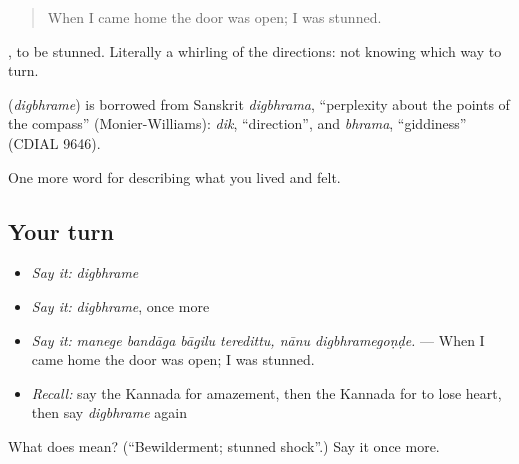 \begin{quote}
When I came home the door was open; I was stunned.
\end{quote}

, to be stunned. Literally a whirling of the directions: not knowing which way to turn.

\begin{cousinweb}
\textbf{} (\emph{digbhrame}) is borrowed from Sanskrit \emph{digbhrama}, \textquotedblleft{}perplexity about the points of the compass\textquotedblright{} (Monier-Williams): \emph{dik}, \textquotedblleft{}direction\textquotedblright{}, and \emph{bhrama}, \textquotedblleft{}giddiness\textquotedblright{} (CDIAL 9646).
\end{cousinweb}

\begin{grammarlens}[title={What you've built}]
One more word for describing what you lived and felt.
\end{grammarlens}

\subsection*{Your turn}
\begin{itemize}
\raggedright
  \item \emph{Say it:} \emph{digbhrame}
  \item \emph{Say it:} \emph{digbhrame}, once more
  \item \emph{Say it:} \emph{manege bandāga bāgilu teredittu, nānu digbhramegoṇḍe.} — When I came home the door was open; I was stunned.
  \item \emph{Recall:} say the Kannada for amazement, then the Kannada for to lose heart, then say \emph{digbhrame} again
\end{itemize}

\begin{tcolorbox}[breakable,colback=teal!4,colframe=teal!35!black,title={Before you move on}]
What does  mean? (\textquotedblleft{}Bewilderment; stunned shock\textquotedblright{}.) Say it once more.
\end{tcolorbox}
